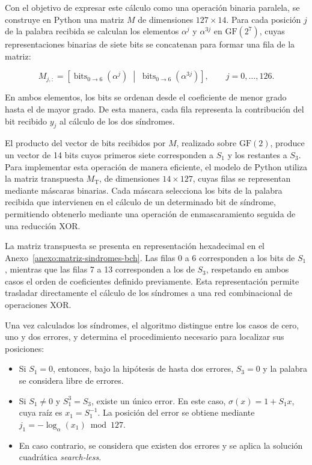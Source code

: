 \documentclass[10pt,a4paper]{article}
\begin{document}
Con el objetivo de expresar este cálculo como una operación
binaria paralela, se construye en Python una matriz $M$
de dimensiones $127\times14$. Para cada posición $j$ de
la palabra recibida se calculan los elementos $\alpha^j$
y $\alpha^{3j}$ en $\mathrm{GF}(2^7)$, cuyas representaciones
binarias de siete bits se concatenan para formar una fila
de la matriz:

\begin{equation}
    M_{j,:}=
    \left[
        \operatorname{bits}_{0\rightarrow6}(\alpha^j)
        \;\middle|\;
        \operatorname{bits}_{0\rightarrow6}(\alpha^{3j})
    \right],
    \qquad j=0,\ldots,126.
    \label{eq:construccion-matriz-sindromes}
\end{equation}

En ambos elementos, los bits se ordenan desde el coeficiente
de menor grado hasta el de mayor grado. De esta manera, cada
fila representa la contribución del bit recibido $y_j$ al
cálculo de los dos síndromes.

El producto del vector de bits recibidos por $M$, realizado
sobre $\mathrm{GF}(2)$, produce un vector de 14 bits cuyos
primeros siete corresponden a $S_1$ y los restantes a $S_3$.
Para implementar esta operación de manera eficiente, el modelo
de Python utiliza la matriz transpuesta $M_{\mathrm{T}}$,
de dimensiones $14\times127$, cuyas filas se representan
mediante máscaras binarias. Cada máscara selecciona los bits
de la palabra recibida que intervienen en el cálculo de un
determinado bit de síndrome, permitiendo obtenerlo mediante
una operación de enmascaramiento seguida de una reducción XOR.

La matriz transpuesta se presenta en representación hexadecimal
en el Anexo~\ref{anexo:matriz-sindromes-bch}. Las filas 0 a 6
corresponden a los bits de $S_1$, mientras que las filas 7 a 13
corresponden a los de $S_3$, respetando en ambos casos el orden
de coeficientes definido previamente. Esta representación
permite trasladar directamente el cálculo de los síndromes
a una red combinacional de operaciones XOR.

Una vez calculados los síndromes, el algoritmo distingue
entre los casos de cero, uno y dos errores, y determina
el procedimiento necesario para localizar sus posiciones:

\begin{itemize}
    \item Si $S_1=0$, entonces, bajo la hipótesis de hasta dos errores,
    $S_3=0$ y la palabra se considera libre de errores.

    \item Si $S_1\neq0$ y $S_1^3=S_3$, existe un único error. En este
    caso, $\sigma(x)=1+S_1x$, cuya raíz es $x_1=S_1^{-1}$. La posición
    del error se obtiene mediante
    $j_1=-\log_{\alpha}(x_1)\bmod127$.

    \item En caso contrario, se considera que existen dos errores y se aplica
    la solución cuadrática \textit{search-less}.
\end{itemize}
\end{document}
